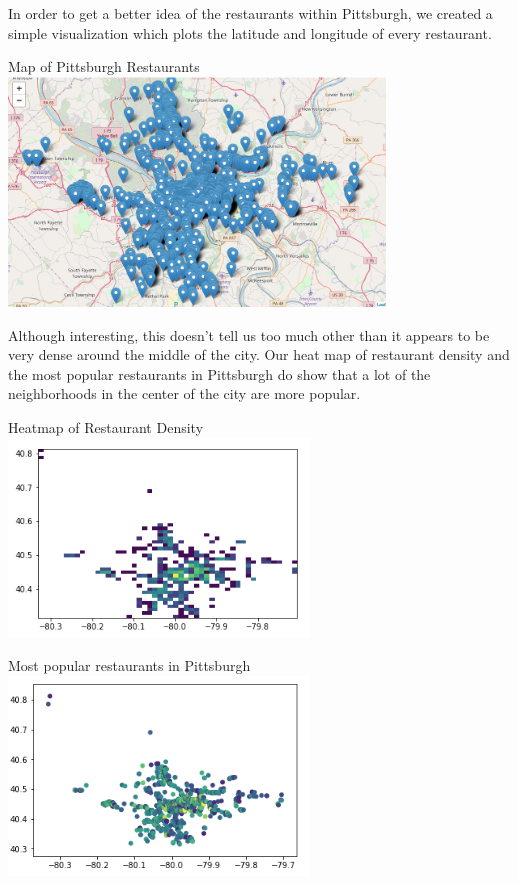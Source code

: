 \documentclass{neu_handout}
\begin{document}
In order to get a better idea of the restaurants within Pittsburgh, we created a simple visualization which plots the latitude and longitude of every restaurant.

\begin{center}
Map of Pittsburgh Restaurants \\
\includegraphics[width=100mm,scale=0.5]{PittsburghRestaurants}\\
\end{center}

Although interesting, this doesn't tell us too much other than it appears to be very dense around the middle of the city. Our heat map of restaurant density and the most popular restaurants in Pittsburgh do show that a lot of the neighborhoods in the center of the city are more popular.

\begin{center}
Heatmap of Restaurant Density \\
\includegraphics[width=80mm,scale=0.5]{pa_rest_density}\\
\end{center}

\begin{center}
Most popular restaurants in Pittsburgh \\
\includegraphics[width=80mm,scale=0.5]{pa_popular_restaurants}\\
\end{center}
\end{document}
